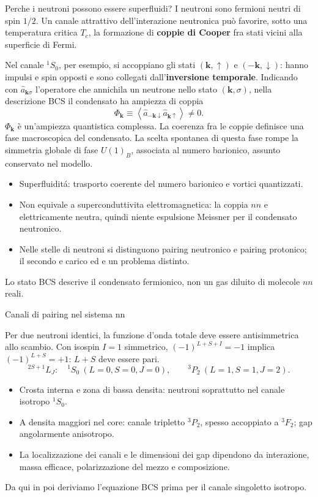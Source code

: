 \begin{frame}[t]{Perche i neutroni possono essere superfluidi?}
\vspace*{3mm}
I neutroni sono fermioni neutri di spin $1/2$.
Un canale attrattivo dell'interazione neutronica può favorire,
sotto una temperatura critica $T_c$, la formazione di
\textbf{coppie di Cooper} fra stati vicini alla superficie di Fermi.

\smallskip
Nel canale ${}^1S_0$, per esempio, si accoppiano gli stati
$(\mathbf k,\uparrow)$ e $(-\mathbf k,\downarrow)$:
hanno impulsi e spin opposti e sono collegati
dall'\textbf{inversione temporale}.
Indicando con $\hat a_{\mathbf k\sigma}$ l'operatore che
annichila un neutrone nello stato $(\mathbf k,\sigma)$,
nella descrizione BCS il condensato ha ampiezza di coppia
\[
\boxed{
\Phi_{\mathbf k}\equiv
\left\langle
\hat a_{-\mathbf k\downarrow}
\hat a_{\mathbf k\uparrow}
\right\rangle\ne0.
}
\]
$\Phi_{\mathbf k}$ è un'ampiezza quantistica complessa.
La coerenza fra le coppie definisce una fase macroscopica
del condensato.
La scelta spontanea di questa fase rompe la simmetria
globale di fase $U(1)_B$, associata al numero barionico,
assunto conservato nel modello.
\begin{itemize}
\item Superfluidit\'a: trasporto coerente del numero barionico e vortici quantizzati.
\item Non equivale a superconduttivita elettromagnetica: la coppia $nn$ e elettricamente neutra, quindi niente espulsione Meissner per il condensato neutronico.
\item Nelle stelle di neutroni si distinguono pairing neutronico e pairing protonico; il secondo e carico ed e un problema distinto.
\end{itemize}
Lo stato BCS descrive il condensato fermionico, non un gas diluito di molecole $nn$ reali.
\end{frame}

\begin{frame}[t]{Canali di pairing nel sistema nn}
\vspace*{3mm}
\small

Per due neutroni identici, la funzione d'onda totale deve essere
antisimmetrica allo scambio. Con isospin $I=1$ simmetrico,
$(-1)^{L+S+I}=-1$ implica $(-1)^{L+S}=+1$: $L+S$ deve essere pari.
\[
{}^{2S+1}L_J:
\quad {}^1S_0\ (L=0,S=0,J=0),\qquad {}^3P_2\ (L=1,S=1,J=2).
\]
\begin{itemize}
\item Crosta interna e zona di bassa densita: neutroni soprattutto nel canale isotropo ${}^1S_0$.
\item A densita maggiori nel core: canale tripletto ${}^3P_2$, spesso accoppiato a ${}^3F_2$; gap angolarmente anisotropo.
\item La localizzazione dei canali e le dimensioni dei gap dipendono da interazione, massa efficace, polarizzazione del mezzo e composizione.
\end{itemize}
Da qui in poi deriviamo l'equazione BCS prima per il canale singoletto isotropo.
\end{frame}

